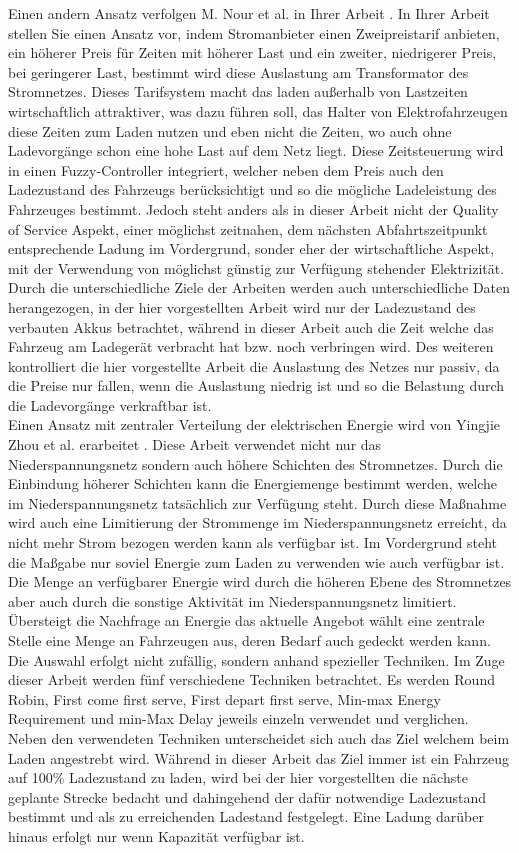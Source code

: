 Einen andern Ansatz verfolgen M. Nour et al. in Ihrer Arbeit \cite{RW_2_1}. In Ihrer Arbeit stellen Sie einen Ansatz vor, indem Stromanbieter einen Zweipreistarif anbieten, ein höherer Preis für Zeiten mit höherer Last und ein zweiter, niedrigerer Preis, bei geringerer Last, bestimmt wird diese Auslastung am Transformator des Stromnetzes. Dieses Tarifsystem macht das laden außerhalb von Lastzeiten wirtschaftlich attraktiver, was dazu führen soll, das Halter von Elektrofahrzeugen diese Zeiten zum Laden nutzen und eben nicht die Zeiten, wo auch ohne Ladevorgänge schon eine hohe Last auf dem Netz liegt. Diese Zeitsteuerung wird in einen Fuzzy-Controller integriert, welcher neben dem Preis auch den Ladezustand des Fahrzeugs berücksichtigt und so die mögliche Ladeleistung des Fahrzeuges bestimmt. Jedoch steht anders als in dieser Arbeit nicht der Quality of Service Aspekt, einer möglichst zeitnahen,  dem nächsten Abfahrtszeitpunkt entsprechende Ladung im Vordergrund, sonder eher der wirtschaftliche Aspekt, mit der Verwendung von möglichst günstig zur Verfügung stehender Elektrizität. Durch die unterschiedliche Ziele der Arbeiten werden auch unterschiedliche Daten herangezogen, in der hier vorgestellten Arbeit wird nur der Ladezustand des verbauten Akkus betrachtet, während in dieser Arbeit auch die Zeit welche das Fahrzeug am Ladegerät verbracht hat bzw. noch verbringen wird. Des weiteren kontrolliert die hier vorgestellte Arbeit die Auslastung des Netzes nur passiv, da die Preise nur fallen, wenn die Auslastung niedrig ist und so die Belastung durch die Ladevorgänge verkraftbar ist.\\
Einen Ansatz mit zentraler Verteilung der elektrischen Energie wird von Yingjie Zhou et al. erarbeitet \cite{RWcentral}. Diese Arbeit verwendet nicht nur das Niederspannungsnetz sondern auch höhere Schichten des Stromnetzes. Durch die Einbindung höherer Schichten kann die Energiemenge bestimmt werden, welche im Niederspannungsnetz tatsächlich zur Verfügung steht. Durch diese Maßnahme wird auch eine Limitierung der Strommenge im Niederspannungsnetz erreicht, da nicht mehr Strom bezogen werden kann als verfügbar ist. Im Vordergrund steht die Maßgabe nur soviel Energie zum Laden zu verwenden wie auch verfügbar ist. Die Menge an verfügbarer Energie wird durch die höheren Ebene des Stromnetzes aber auch durch die sonstige Aktivität im Niederspannungsnetz limitiert. Übersteigt die Nachfrage an Energie das aktuelle Angebot wählt eine zentrale Stelle eine Menge an Fahrzeugen aus, deren Bedarf auch gedeckt werden kann. Die Auswahl erfolgt nicht zufällig, sondern anhand spezieller Techniken. Im Zuge dieser Arbeit werden fünf verschiedene Techniken betrachtet. Es werden Round Robin, First come first serve, First depart first serve, Min-max Energy Requirement und min-Max Delay jeweils einzeln verwendet und verglichen. Neben den verwendeten Techniken unterscheidet sich auch das Ziel welchem beim Laden angestrebt wird. Während in dieser Arbeit das Ziel immer ist ein Fahrzeug auf 100\% Ladezustand zu laden, wird bei der hier vorgestellten die nächste geplante Strecke bedacht und dahingehend der dafür notwendige Ladezustand bestimmt und als zu erreichenden Ladestand festgelegt. Eine Ladung darüber hinaus erfolgt nur wenn Kapazität verfügbar ist.




